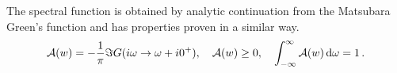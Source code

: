 \documentclass[11pt]{article}
\begin{document}
The spectral function is obtained by analytic continuation from the Matsubara Green's function and has properties proven in a similar way.
%
\begin{equation}
\mathcal{A}(w) = -\frac{1}{\pi} \Im{G(i\omega \rightarrow \omega + i0^+)},
\quad
\mathcal{A}(w) \geq 0,
\quad
\int_{-\infty}^{\infty} \mathcal{A}(w) \dif \omega = 1
\, .
\end{equation}
%











\end{document}
